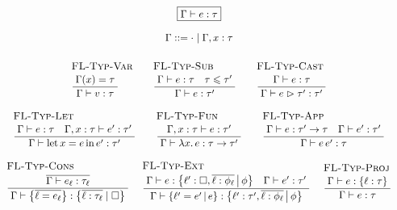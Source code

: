 $$ 
\begin{array}{c}
\boxed{\Gamma \vdash e : \tau} 
\\[0.5em]
\Gamma ::= \cdot \mid \Gamma, x : \tau
\\[1em]
\irule{FL-Typ-Var}{\Gamma(x) = \tau}{\Gamma \vdash v : \tau}
\quad 
\irule{FL-Typ-Sub}{\Gamma \vdash e : \tau \quad \tau \sub \tau'}{\Gamma \vdash e : \tau'}
\quad
\irule{FL-Typ-Cast}{\Gamma \vdash e : \tau}{\Gamma \vdash \flcast e \tau' : \tau'}
\\[2em]
\irule{FL-Typ-Let}{\Gamma \vdash e : \tau \quad \Gamma, x : \tau \vdash e' : \tau'}{\Gamma \vdash \fllet{x}{e}{e'} : \tau'}
\quad 
\irule{FL-Typ-Fun}{\Gamma, x : \tau \vdash e : \tau'}{\Gamma \vdash \fllam{x} e : \tau \to \tau'}    
\quad 
\irule{FL-Typ-App}{\Gamma \vdash e : \tau' \to \tau \quad \Gamma \vdash e' : \tau'}{\Gamma \vdash e\,e' : \tau}
\\[2em]
\irule{FL-Typ-Cons}
    {\overline{\Gamma \vdash e_\ell : \tau_\ell}}
    {\Gamma \vdash \flrec{\overline{\ell = e_\ell}} : \flrec{\overline{\ell : \tau_\ell} \mid \flabsent}}
\;
\irule{FL-Typ-Ext}
    {\Gamma \vdash e : \flext{\ell' : \flabsent, \overline{\ell : \phi_\ell}}{\phi} \quad \Gamma \vdash e' : \tau'}
    {\Gamma \vdash \flext{\ell' = e'}{e} : \flext{\ell' : \tau', \overline{\ell : \phi_\ell}}{\phi}}
\;
\irule{FL-Typ-Proj}
    {\Gamma \vdash e : \flrec{ \ell : \tau }}
    {\Gamma \vdash e : \tau}
\end{array} 
$$